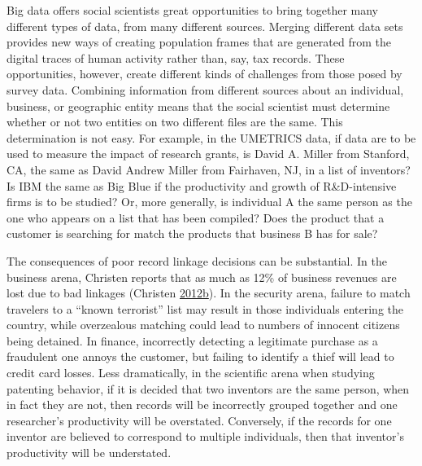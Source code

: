 \documentclass[]{krantz}
\begin{document}
Big data offers social scientists great opportunities to bring together
many different types of data, from many different sources. Merging
different data sets provides new ways of creating population frames that
are generated from the digital traces of human activity rather than,
say, tax records. These opportunities, however, create different kinds
of challenges from those posed by survey data. Combining information
from different sources about an individual, business, or geographic
entity means that the social scientist must determine whether or not two
entities on two different files are the same. This determination is not
easy. For example, in the UMETRICS data, if data are to be used to
measure the impact of research grants, is David A. Miller from Stanford,
CA, the same as David Andrew Miller from Fairhaven, NJ, in a list of
inventors? Is IBM the same as Big Blue if the productivity and growth of
R\&D-intensive firms is to be studied? Or, more generally, is individual
A the same person as the one who appears on a list that has been
compiled? Does the product that a customer is searching for match the
products that business B has for sale?

The consequences of poor record linkage decisions can be substantial. In
the business arena, Christen reports that as much as 12\% of business
revenues are lost due to bad linkages (Christen
\protect\hyperlink{ref-christen2012data}{2012}\protect\hyperlink{ref-christen2012data}{b}).
In the security arena, failure to match travelers to a ``known
terrorist'' list may result in those individuals entering the country,
while overzealous matching could lead to numbers of innocent citizens
being detained. In finance, incorrectly detecting a legitimate purchase
as a fraudulent one annoys the customer, but failing to identify a thief
will lead to credit card losses. Less dramatically, in the scientific
arena when studying patenting behavior, if it is decided that two
inventors are the same person, when in fact they are not, then records
will be incorrectly grouped together and one researcher's productivity
will be overstated. Conversely, if the records for one inventor are
believed to correspond to multiple individuals, then that inventor's
productivity will be understated.
\end{document}
